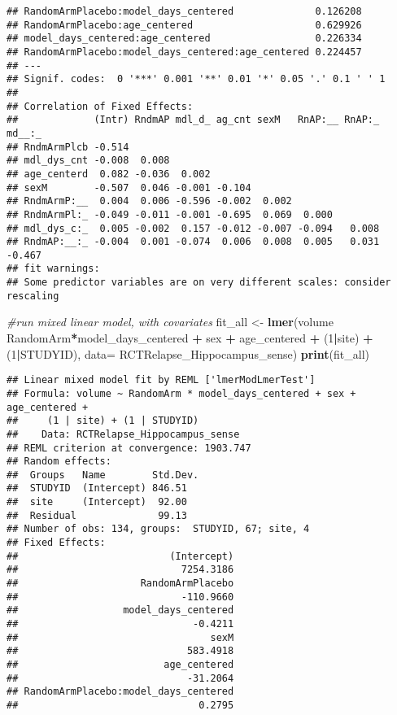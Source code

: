 \documentclass[]{article}
\newenvironment{Shaded}{\begin{snugshade}}{\end{snugshade}}
\newcommand{\KeywordTok}[1]{\textcolor[rgb]{0.13,0.29,0.53}{\textbf{#1}}}
\newcommand{\DataTypeTok}[1]{\textcolor[rgb]{0.13,0.29,0.53}{#1}}
\newcommand{\DecValTok}[1]{\textcolor[rgb]{0.00,0.00,0.81}{#1}}
\newcommand{\StringTok}[1]{\textcolor[rgb]{0.31,0.60,0.02}{#1}}
\newcommand{\CommentTok}[1]{\textcolor[rgb]{0.56,0.35,0.01}{\textit{#1}}}
\newcommand{\OperatorTok}[1]{\textcolor[rgb]{0.81,0.36,0.00}{\textbf{#1}}}
\newcommand{\NormalTok}[1]{#1}
\theoremstyle{definition}
\theoremstyle{definition}
\theoremstyle{definition}
\theoremstyle{remark}
\begin{document}
\begin{verbatim}
## RandomArmPlacebo:model_days_centered              0.126208    
## RandomArmPlacebo:age_centered                     0.629926    
## model_days_centered:age_centered                  0.226334    
## RandomArmPlacebo:model_days_centered:age_centered 0.224457    
## ---
## Signif. codes:  0 '***' 0.001 '**' 0.01 '*' 0.05 '.' 0.1 ' ' 1
## 
## Correlation of Fixed Effects:
##             (Intr) RndmAP mdl_d_ ag_cnt sexM   RnAP:__ RnAP:_ md__:_
## RndmArmPlcb -0.514                                                  
## mdl_dys_cnt -0.008  0.008                                           
## age_centerd  0.082 -0.036  0.002                                    
## sexM        -0.507  0.046 -0.001 -0.104                             
## RndmArmP:__  0.004  0.006 -0.596 -0.002  0.002                      
## RndmArmPl:_ -0.049 -0.011 -0.001 -0.695  0.069  0.000               
## mdl_dys_c:_  0.005 -0.002  0.157 -0.012 -0.007 -0.094   0.008       
## RndmAP:__:_ -0.004  0.001 -0.074  0.006  0.008  0.005   0.031 -0.467
## fit warnings:
## Some predictor variables are on very different scales: consider rescaling
\end{verbatim}

\begin{Shaded}
\begin{Highlighting}[]
\CommentTok{#run mixed linear model, with covariates}
\NormalTok{  fit_all <-}\StringTok{ }\KeywordTok{lmer}\NormalTok{(volume }\OperatorTok{~}\StringTok{ }\NormalTok{RandomArm}\OperatorTok{*}\NormalTok{model_days_centered }\OperatorTok{+}\StringTok{ }\NormalTok{sex }\OperatorTok{+}\StringTok{ }\NormalTok{age_centered }\OperatorTok{+}\StringTok{ }\NormalTok{(}\DecValTok{1}\OperatorTok{|}\NormalTok{site) }\OperatorTok{+}\StringTok{ }\NormalTok{(}\DecValTok{1}\OperatorTok{|}\NormalTok{STUDYID), }\DataTypeTok{data=}\NormalTok{ RCTRelapse_Hippocampus_sense)}
  \KeywordTok{print}\NormalTok{(fit_all)}
\end{Highlighting}
\end{Shaded}

\begin{verbatim}
## Linear mixed model fit by REML ['lmerModLmerTest']
## Formula: volume ~ RandomArm * model_days_centered + sex + age_centered +  
##     (1 | site) + (1 | STUDYID)
##    Data: RCTRelapse_Hippocampus_sense
## REML criterion at convergence: 1903.747
## Random effects:
##  Groups   Name        Std.Dev.
##  STUDYID  (Intercept) 846.51  
##  site     (Intercept)  92.00  
##  Residual              99.13  
## Number of obs: 134, groups:  STUDYID, 67; site, 4
## Fixed Effects:
##                          (Intercept)  
##                            7254.3186  
##                     RandomArmPlacebo  
##                            -110.9660  
##                  model_days_centered  
##                              -0.4211  
##                                 sexM  
##                             583.4918  
##                         age_centered  
##                             -31.2064  
## RandomArmPlacebo:model_days_centered  
##                               0.2795
\end{verbatim}
\end{document}
